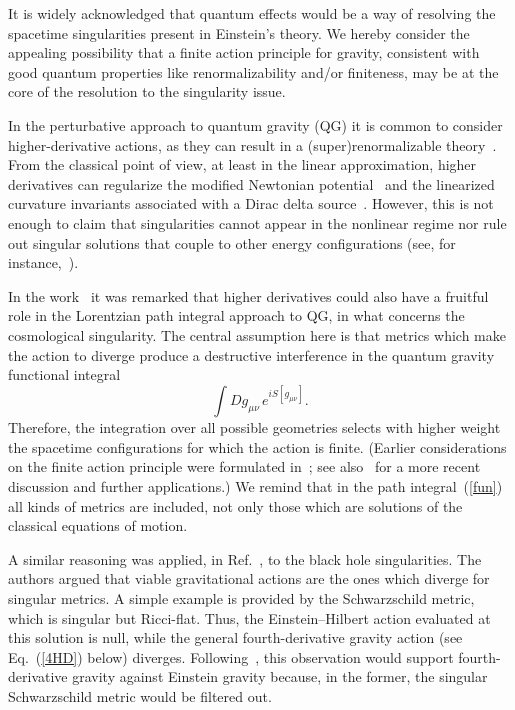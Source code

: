 \documentclass[aps,prd,a4paper,twocolumn,showpacs,showkeys,preprintnumbers,amsmath,amssymb,nofootinbib,usenames,dvipsnames]{revtex4-2}
\def\beq{\begin{equation}}
\def\eeq{\end{equation}}
\newcommand{\eq}[1]{(\ref{#1})}
\newcommand{\n}[1]{\label{#1}}
\begin{document}
It is widely acknowledged that quantum effects would be a way of resolving the spacetime singularities present in Einstein's theory.
We hereby consider the appealing possibility that a finite action principle for gravity, consistent with good quantum properties like renormalizability and/or finiteness, may be at the core of the resolution to the singularity issue.

In the perturbative approach to quantum gravity (QG) it is common to consider higher-derivative actions, as they can result in a (super)renormalizable theory~\cite{Stelle77,AsoreyLopezShapiro}. From the classical point of view, at least in the linear approximation, higher derivatives can regularize the modified Newtonian potential~\cite{Newton-MNS,Newton-BLG,BreTib2} and the linearized curvature invariants associated with a Dirac delta source~\cite{BreTib1,BreTib2,Nos6der}. However, this is not enough to claim that singularities cannot appear in the nonlinear regime nor rule out singular solutions that couple to other energy configurations (see, for instance,~\cite{Stelle78,Stelle15-PRL-PRD,Holdom:2002xy,Holdom:2016nek,Bonanno:2019rsq}).

In the work~\cite{Lehners:2019ibe} it was remarked that higher derivatives could also have a fruitful role in the Lorentzian path integral approach to QG, in what concerns the cosmological singularity. The central assumption here is that metrics which make the action to diverge produce a destructive interference in the quantum gravity functional integral 
\beq
\n{fun}
\int D g _{\mu\nu}  
\, e^{i S [g _{\mu\nu}  ]}
.
\eeq 
Therefore, the integration over all possible geometries selects with higher weight the spacetime configurations for which the action is finite. (Earlier considerations on the finite action principle were formulated in~\citep{BarrowTipler}; see also~\cite{Barrow:2019gzc,Borissova:2020knn,Jonas:2021xkx,Chojnacki:2021ves} for a more recent discussion and further applications.) We remind that in the path integral~\eq{fun} all kinds of metrics are included, not only those which are solutions of the classical equations of motion. 

A similar reasoning was applied, in Ref.~\cite{Borissova:2020knn}, to the black hole singularities. 
The authors argued that viable gravitational actions are the ones which diverge for singular metrics.
A simple example is provided by the Schwarzschild metric, which is singular but Ricci-flat. Thus, the Einstein--Hilbert action evaluated at this solution is null, while the general fourth-derivative gravity action (see Eq.~\eq{4HD} below) diverges. Following~\cite{Borissova:2020knn}, this observation would support fourth-derivative gravity against Einstein gravity because, in the former, the singular Schwarzschild metric would be filtered out.
\end{document}
